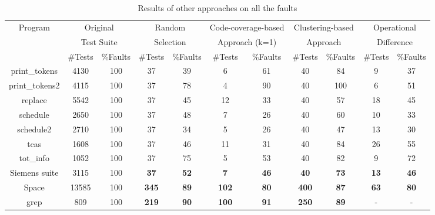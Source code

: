 \documentclass{sig-alternate}
\begin{document}
\begin{table}[htbp]
\caption{Results of other approaches on all the
faults}\label{tab:other} \center
\begin{tabular}{|c|c|c|c|c|c|c|c|c|c|c|}

\hline Program   & \multicolumn{2}{c}{Original } \vline &
\multicolumn{2}{c}{Random} \vline &
\multicolumn{2}{c}{Code-coverage-based} \vline &
\multicolumn{2}{c}{Clustering-based} \vline &
\multicolumn{2}{c}{Operational} \vline
    \\

& \multicolumn{2}{c}{Test Suite} \vline &
\multicolumn{2}{c}{Selection} \vline & \multicolumn{2}{c}{Approach
(k=1)} \vline & \multicolumn{2}{c}{Approach} \vline &
\multicolumn{2}{c}{Difference} \vline
   \\

 \cline{2-11}  & \#Tests &   \%Faults & \#Tests &   \%Faults &
\#Tests &   \%Faults & \#Tests &   \%Faults & \#Tests &   \%Faults  \\


\hline  print\_tokens   &   4130    &   100 &   37  &   39&   6   &   61  &   40  &   84  &   9   &   37   \\
\hline  print\_tokens2  &   4115    &   100 &   37  &   78&   4   &   90  &   40  &   100 &   6   &   51    \\
\hline  replace &   5542    &   100 &   37  &   45&   12  &   33  &   40  &   57  &   18  &   45    \\
\hline  schedule    &   2650    &   100 &   37  &   48&   7   &   26  &   40  &   60  &   10  &   33   \\
\hline  schedule2   &   2710    &   100 &   37  &   34&   5   &   26  &   40  &   47  &   13  &   30    \\
\hline  tcas    &   1608    &   100 &   37  &   46&   11  &   31  &   40  &   84  &   26  &   55    \\
\hline  tot\_info &   1052    &   100 &   37  &   75&   5   &   53  &   40  &   82  &   9   &   72   \\
\hline  Siemens suite   &   3115    &   100 &   \textbf{37}  &   \textbf{52}&   \textbf{7}   &   \textbf{46}  &   \textbf{40}  &   \textbf{73}  &   \textbf{13}  &   \textbf{46}   \\
\hline  Space   &   13585   &   100 &   \textbf{345} &   \textbf{89}&   \textbf{102} &   \textbf{80}  &   \textbf{400} &   \textbf{87}  &   \textbf{63}  &   \textbf{80}  \\
\hline  grep    &   809 &   100 &   \textbf{219} &   \textbf{90}&   \textbf{100} &   \textbf{91}  &   \textbf{250} &   \textbf{89}  &   -   &   -     \\

\hline
\end{tabular}
\end{table}
\end{document}
